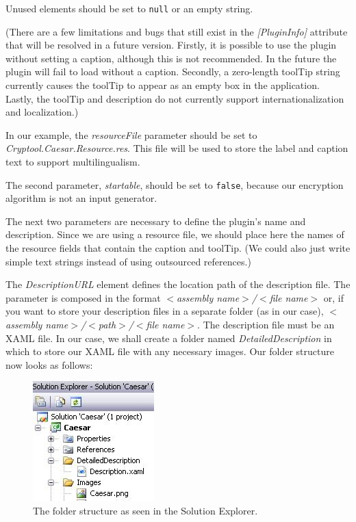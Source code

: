 \noindent Unused elements should be set to \texttt{null} or an empty string.

(There are a few limitations and bugs that still exist in the \textit{[PluginInfo]} attribute that will be resolved in a future version. Firstly, it is possible to use the plugin without setting a caption, although this is not recommended. In the future the plugin will fail to load without a caption. Secondly, a zero-length toolTip string currently causes the toolTip to appear as an empty box in the application. Lastly, the toolTip and description do not currently support internationalization and localization.)

In our example, the \textit{resourceFile} parameter should be set to \textit{Cryptool.Caesar.Resource.res}. This file will be used to store the label and caption text to support multilingualism.

The second parameter, \textit{startable}, should be set to \texttt{false}, because our encryption algorithm is not an input generator.

The next two parameters are necessary to define the plugin's name and description. Since we are using a resource file, we should place here the names of the resource fields that contain the caption and toolTip. (We could also just write simple text strings instead of using outsourced references.)

The \textit{DescriptionURL} element defines the location path of the description file. The parameter is composed in the format \textit{$<$assembly name$>$/$<$file name$>$} or, if you want to store your description files in a separate folder (as in our case), \textit{$<$assembly name$>$/$<$path$>$/$<$file name$>$}. The description file must be an XAML file. In our case, we shall create a folder named \textit{DetailedDescription} in which to store our XAML file with any necessary images. Our folder structure now looks as follows:

\begin{figure}[h!]
	\centering
		\includegraphics[width=.30\textwidth]{figures/detailed_description.jpg}
	\caption{The folder structure as seen in the Solution Explorer.}
	\label{fig:attribute_plugininfo_icon_path}
\end{figure}

